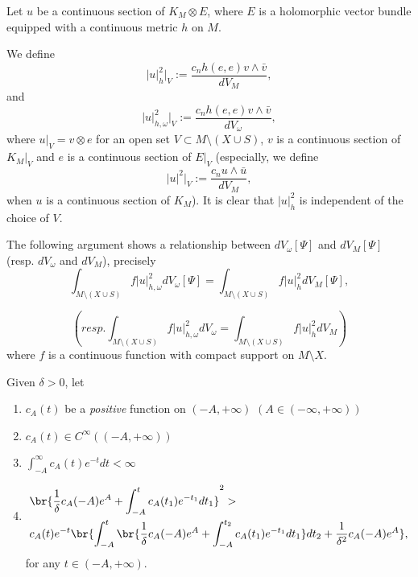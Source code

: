 Let $u$ be a continuous section of $K_{M}\otimes E$, where $E$ is a holomorphic vector bundle
equipped with a continuous metric $h$ on $M$.

We define
$$|u|^{2}_{h}|_{V}:=\frac{c_{n}h(e,e)v\wedge\bar{v}}{dV_{M}},$$
and
$$|u|^{2}_{h,\omega}|_{V}:=\frac{c_{n}h(e,e)v\wedge\bar{v}}{dV_{\omega}},$$
where $u|_{V}=v\otimes e$ for an open set $V\subset M\setminus (X\cup S)$, $v$ is a continuous section of
$K_{M}|_{V}$ and $e$ is a continuous
section of $E|_{V}$ (especially, we define
$$|u|^{2}|_{V}:=\frac{c_{n}u\wedge\bar{u}}{dV_{M}},$$
when $u$ is a continuous section of $K_{M}$). It is clear that
$|u|^{2}_{h}$ is independent of the choice of $V$.

The following argument shows a relationship between
$dV_{\omega}[\Psi]$ and $dV_{M}[\Psi]$ (resp. $dV_{\omega}$ and
$dV_{M}$), precisely
\begin{equation}
\label{equ:9.1}
\int_{M\setminus(X\cup S)}f|u|^{2}_{h,\omega}dV_{\omega}[\Psi]
=\int_{M\setminus(X\cup S)}f|u|^{2}_{h}dV_{M}[\Psi],
\end{equation}

\begin{equation}
\label{equ:9.2}
(resp.
\int_{M\setminus(X\cup S)}f|u|^{2}_{h,\omega}dV_{\omega}
=\int_{M\setminus(X\cup S)}f|u|^{2}_{h}dV_{M})
\end{equation}
where $f$ is a continuous function with compact support on $M\setminus X$.


Given $\delta>0$, let
\begin{enumerate}
  \item {} $c_{A}(t)$ be a \textit{positive} function on
$(-A,+\infty)$ $(A\in(-\infty,+\infty))$
\item {} $c_{A}(t)\in C^{\infty}((-A,+\infty))$
\item {} $\int_{-A}^{\infty}c_{A}(t)e^{-t}dt<\infty$
\item {} \begin{equation}
\label{equ:c_A_delta}
\begin{split}
&\br{\frac{1}{\delta}c_{A}(-A)e^{A}+\int_{-A}^{t}c_{A}(t_{1})e^{-t_{1}}dt_{1}}^{2}>\\&c_{A}(t)e^{-t}
\br{\int_{-A}^{t}\br{\frac{1}{\delta}c_{A}(-A)e^{A}+\int_{-A}^{t_{2}}c_{A}(t_{1})e^{-t_{1}}dt_{1}}
dt_{2}+\frac{1}{\delta^{2}}c_{A}(-A)e^{A}},
\end{split}
\end{equation}
for any $t\in(-A,+\infty)$.
\end{enumerate}

